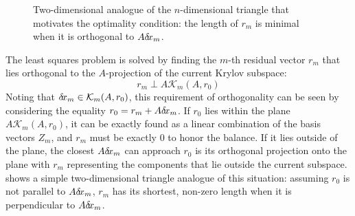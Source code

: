 \documentclass[12pt]{UWMadThesis}
\begin{document}
\begin{figure}[b]
\begin{subfigure}[t]{0.33\textwidth}
    \end{subfigure}
    \caption{Two-dimensional analogue of the $n$-dimensional triangle that motivates the optimality condition: the length of $r_m$ is minimal when it is orthogonal to $A\delta \mkern-3.00mu x_m$.}%
    \label{Fig:TriangleExample}%
\end{figure}

The least squares problem is solved by finding the $m$-th residual vector $r_m$ that lies orthogonal to the $A$-projection of the current Krylov subspace:
\begin{equation}
    r_m \perp A \mathcal{K}_m(A,r_0)
\end{equation}
Noting that $\delta \mkern-3.00mu x_m \in \mathcal{K}_m(A,r_0)$, this requirement of orthogonality can be seen by considering the equality $r_0 = r_m + A\delta \mkern-3.00mu x_m$.
If $r_0$ lies within the plane $A \mathcal{K}_m(A,r_0)$, it can be exactly found as a linear combination of the basis vectors $Z_m$, and $r_m$ must be exactly $0$ to honor the balance.
If it lies outside of the plane, the closest $A\delta \mkern-3.00mu x_m$ can approach $r_0$ is its orthogonal projection onto the plane with $r_m$ representing the components that lie outside the current subspace.
 shows a simple two-dimensional triangle analogue of this situation: assuming $r_0$ is not parallel to $A\delta \mkern-3.00mu x_m$, $r_m$ has its shortest, non-zero length when it is perpendicular to $A\delta \mkern-3.00mu x_m$.
\end{document}

